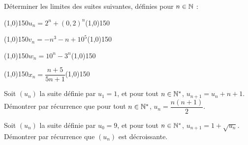 \documentclass[a4paper,11pt,DIV12,BCOR0mm]{scrartcl}
\begin{document}
\begin{exercice}
 Déterminer les limites des suites suivantes, définies pour $n\in\mathbb{N}$ :
\begin{center}
\line(1,0){150}\hfill$u_n=2^n+\left( 0,2\right)^n$\hfill\line(1,0){150}
\end{center}
\vfill
\begin{center}
\line(1,0){150}\hfill$v_n=-n^3-n+10^5$\hfill\line(1,0){150}
\end{center}
\vfill\begin{center}
\line(1,0){150}\hfill$w_n=10^n-3^n$\hfill\line(1,0){150}
\end{center}
\vfill\begin{center}
\line(1,0){150}\hfill$x_n=\dfrac{n+5}{5n+1}$\hfill\line(1,0){150}
\end{center}
\vfill
\end{exercice}
\pagebreak


\begin{exercice}
 Soit $(u_n)$ la suite définie par $u_1=1$, et pour tout $n\in\mathbb{N}^*$, $u_{n+1}=u_n+n+1$.
Démontrer par récurrence que pour tout $n\in\mathbb{N}^*$, $u_n=\dfrac{n(n+1)}{2}$. 
\end{exercice}
\vfill
\begin{exercice}
 Soit $(u_n)$ la suite définie par $u_0=9$, et pour tout $n\in\mathbb{N}^*$, $u_{n+1}=1+\sqrt{u_n}$.
Démontrer par récurrence que $(u_n)$ est décroissante.
\end{exercice}
\vfill
\end{document}
